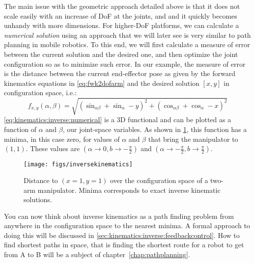 The main issue with the geometric approach detailed above is that it does not scale easily with an increase of DoF at the joints, and and it quickly becomes unhandy with more dimensions.
For higher-DoF platforms, we can calculate a \textsl{numerical solution} using an approach that we will later see is very similar to path planning in mobile robotics.
To this end, we will first calculate a measure of error between the current solution and the desired one, and then optimize the joint configuration so as to minimize such error.
In our example, the measure of error is the distance between the current end-effector pose as given by the forward kinematics equations in \cref{eq:fwk2dofarm} and the desired solution $[x,y]$ in configuration space, i.e.:
\begin{equation}\label{eq:kinematics:inverse:numerical}
f_{x,y}(\alpha,\beta)=\sqrt{\left(\sin_{\alpha\beta} + \sin_\alpha - y\right)^2 + \left(\cos_{\alpha\beta}+\cos_\alpha - x\right)^2}
\end{equation}
\cref{eq:kinematics:inverse:numerical} is a 3D functional and can be plotted as a function of $\alpha$ and $\beta$, our joint-space variables.
As shown in \cref{fig:inversekinematics}, this function has a minima, in this case zero, for values of $\alpha$ and $\beta$ that bring the manipulator to $(1,1)$. These values are $(\alpha \rightarrow 0, b \rightarrow -\frac{\pi}{2})$ and $(\alpha \rightarrow -\frac{\pi}{2}, b \rightarrow \frac{\pi}{2})$.

\begin{figure}
    \centering
        \texttt{[image: figs/inversekinematics]}
    \caption{Distance to $(x=1,y=1)$ over the configuration space of a two-arm manipulator. Minima corresponds to exact inverse kinematic solutions.}
    \label{fig:inversekinematics}
\end{figure}

You can now think about inverse kinematics as a path finding problem from anywhere in the configuration space to the nearest minima. A formal approach to doing this will be discussed in \cref{sec:kinematics:inverse:feedbackcontrol}. How to find shortest paths in space, that is finding the shortest route for a robot to get from A to B will be a subject of chapter~\ref{chap:pathplanning}.

